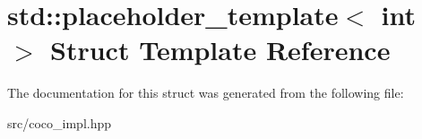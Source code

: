 \hypertarget{structstd_1_1placeholder__template}{}\section{std\+:\+:placeholder\+\_\+template$<$ int $>$ Struct Template Reference}
\label{structstd_1_1placeholder__template}


The documentation for this struct was generated from the following file\+:\begin{DoxyCompactItemize}
\item 
src/coco\+\_\+impl.\+hpp\end{DoxyCompactItemize}
